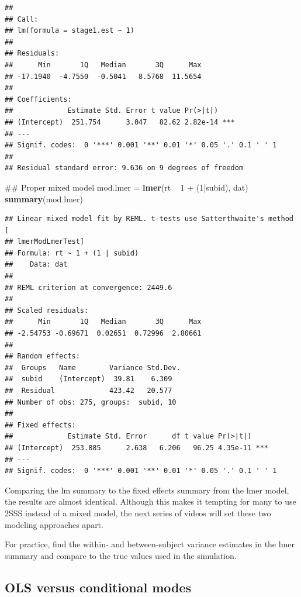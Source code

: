 \documentclass[]{book}
\newenvironment{Shaded}{\begin{snugshade}}{\end{snugshade}}
\newcommand{\KeywordTok}[1]{\textcolor[rgb]{0.13,0.29,0.53}{\textbf{{#1}}}}
\newcommand{\DecValTok}[1]{\textcolor[rgb]{0.00,0.00,0.81}{{#1}}}
\newcommand{\StringTok}[1]{\textcolor[rgb]{0.31,0.60,0.02}{{#1}}}
\newcommand{\NormalTok}[1]{{#1}}
\begin{document}
\begin{verbatim}
## 
## Call:
## lm(formula = stage1.est ~ 1)
## 
## Residuals:
##      Min       1Q   Median       3Q      Max 
## -17.1940  -4.7550  -0.5041   8.5768  11.5654 
## 
## Coefficients:
##             Estimate Std. Error t value Pr(>|t|)    
## (Intercept)  251.754      3.047   82.62 2.82e-14 ***
## ---
## Signif. codes:  0 '***' 0.001 '**' 0.01 '*' 0.05 '.' 0.1 ' ' 1
## 
## Residual standard error: 9.636 on 9 degrees of freedom
\end{verbatim}

\begin{Shaded}
\begin{Highlighting}[]
\NormalTok{## Proper mixed model}
\NormalTok{mod.lmer =}\StringTok{ }\KeywordTok{lmer}\NormalTok{(rt ~}\StringTok{ }\DecValTok{1} \NormalTok{+}\StringTok{ }\NormalTok{(}\DecValTok{1}\NormalTok{|subid), dat)}
\KeywordTok{summary}\NormalTok{(mod.lmer)}
\end{Highlighting}
\end{Shaded}

\begin{verbatim}
## Linear mixed model fit by REML. t-tests use Satterthwaite's method [
## lmerModLmerTest]
## Formula: rt ~ 1 + (1 | subid)
##    Data: dat
## 
## REML criterion at convergence: 2449.6
## 
## Scaled residuals: 
##      Min       1Q   Median       3Q      Max 
## -2.54753 -0.69671  0.02651  0.72996  2.80661 
## 
## Random effects:
##  Groups   Name        Variance Std.Dev.
##  subid    (Intercept)  39.81    6.309  
##  Residual             423.42   20.577  
## Number of obs: 275, groups:  subid, 10
## 
## Fixed effects:
##             Estimate Std. Error      df t value Pr(>|t|)    
## (Intercept)  253.885      2.638   6.206   96.25 4.35e-11 ***
## ---
## Signif. codes:  0 '***' 0.001 '**' 0.01 '*' 0.05 '.' 0.1 ' ' 1
\end{verbatim}

Comparing the lm summary to the fixed effects summary from the lmer
model, the results are almost identical. Although this makes it tempting
for many to use 2SSS instead of a mixed model, the next series of videos
will set these two modeling approaches apart.

For practice, find the within- and between-subject variance estimates in
the lmer summary and compare to the true values used in the simulation.

\subsection{OLS versus conditional
modes}\label{ols-versus-conditional-modes}
\end{document}
